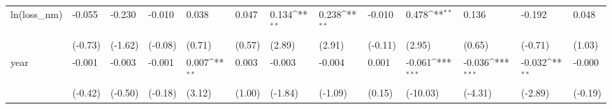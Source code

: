\def\sym#1{\ifmmode^{#1}\else\(^{#1}\)\fi}
\begin{tabular}{p{1.5cm} p{1.7cm} p{1.7cm} p{1.7cm}  p{1.7cm} p{1.7cm} p{1.7cm} p{1.7cm} p{1.7cm}  p{1.7cm} p{1.7cm} p{1.7cm} p{1.7cm} }
\hline
ln(loss\_nm)     &   -0.055         &   -0.230         &   -0.010         &    0.038         &    0.047         &    0.134\sym{**} &    0.238\sym{**} &   -0.010         &    0.478\sym{**} &    0.136         &   -0.192         &    0.048         \\
                &  (-0.73)         &  (-1.62)         &  (-0.08)         &   (0.71)         &   (0.57)         &   (2.89)         &   (2.91)         &  (-0.11)         &   (2.95)         &   (0.65)         &  (-0.71)         &   (1.03)         \\
year            &   -0.001         &   -0.003         &   -0.001         &    0.007\sym{**} &    0.003         &   -0.003         &   -0.004         &    0.001         &   -0.061\sym{***}&   -0.036\sym{***}&   -0.032\sym{**} &   -0.000         \\
                &  (-0.42)         &  (-0.50)         &  (-0.18)         &   (3.12)         &   (1.00)         &  (-1.84)         &  (-1.09)         &   (0.15)         & (-10.03)         &  (-4.31)         &  (-2.89)         &  (-0.19)         \\
\end{tabular}
